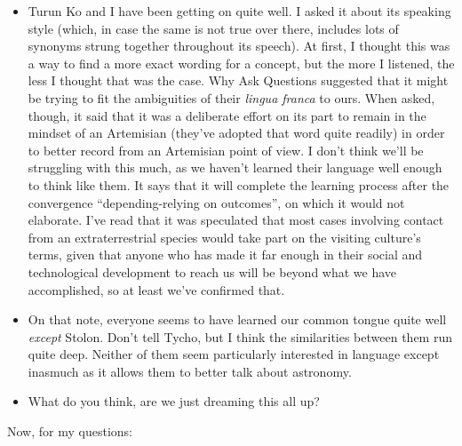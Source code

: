 \begin{itemize}
\item
  Turun Ko and I have been getting on quite well. I asked it about its speaking style (which, in case the same is not true over there, includes lots of synonyms strung together throughout its speech). At first, I thought this was a way to find a more exact wording for a concept, but the more I listened, the less I thought that was the case. Why Ask Questions suggested that it might be trying to fit the ambiguities of their \emph{lingua franca} to ours. When asked, though, it said that it was a deliberate effort on its part to remain in the mindset of an Artemisian (they've adopted that word quite readily) in order to better record from an Artemisian point of view. I don't think we'll be struggling with this much, as we haven't learned their language well enough to think like them. It says that it will complete the learning process after the convergence ``depending-relying on outcomes'', on which it would not elaborate. I've read that it was speculated that most cases involving contact from an extraterrestrial species would take part on the visiting culture's terms, given that anyone who has made it far enough in their social and technological development to reach us will be beyond what we have accomplished, so at least we've confirmed that.
\item
  On that note, everyone seems to have learned our common tongue quite well \emph{except} Stolon. Don't tell Tycho, but I think the similarities between them run quite deep. Neither of them seem particularly interested in language except inasmuch as it allows them to better talk about astronomy.
\item
  What do you think, are we just dreaming this all up?
\end{itemize}

\pagebreak Now, for my questions:


